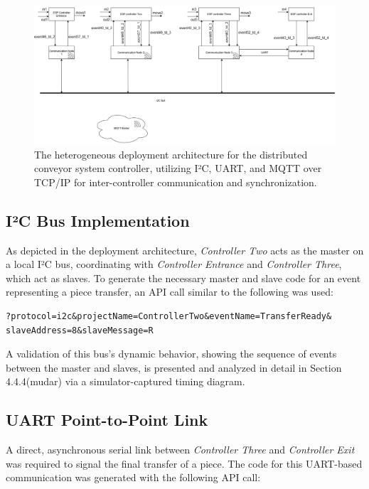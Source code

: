 \begin{figure}[htb]
    \centering
    \includegraphics[width=1\textwidth]{Chapters/Figures/prototypelayout.png}
    \caption{The heterogeneous deployment architecture for the distributed conveyor system controller, utilizing I²C, UART, and MQTT over TCP/IP for inter-controller communication and synchronization.}
    \label{fig:deployment_layout}
\end{figure}

\subsection{I²C Bus Implementation}
As depicted in the deployment architecture, \textit{Controller Two} acts as the master on a local I²C bus, coordinating with \textit{Controller Entrance} and \textit{Controller Three}, which act as slaves. To generate the necessary master and slave code for an event representing a piece transfer, an API call similar to the following was used:

\begin{verbatim}
?protocol=i2c&projectName=ControllerTwo&eventName=TransferReady&
slaveAddress=8&slaveMessage=R
\end{verbatim}


A validation of this bus's dynamic behavior, showing the sequence of events between the master and slaves, is presented and analyzed in detail in Section 4.4.4(mudar) via a simulator-captured timing diagram.


\subsection{UART Point-to-Point Link}
A direct, asynchronous serial link between \textit{Controller Three} and \textit{Controller Exit} was required to signal the final transfer of a piece. The code for this UART-based communication was generated with the following API call:

